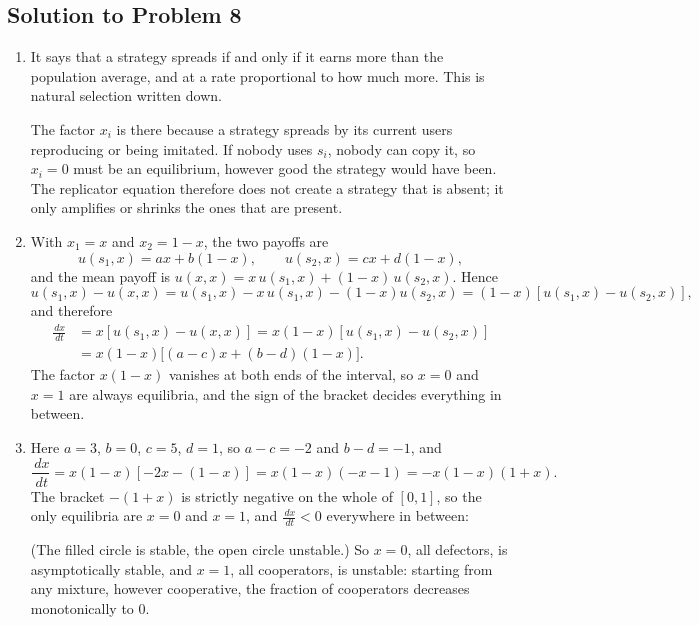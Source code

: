 \documentclass[a4paper,12pt]{article}
\newcommand{\dd}{\,d}
\begin{document}
\subsection*{Solution to Problem 8}

\begin{enumerate}[label=(\alph*)]
\item It says that a strategy spreads if and only if it earns more than the population average, and at a rate proportional to how much more. This is natural selection written down.

The factor $x_i$ is there because a strategy spreads by its current users reproducing or being imitated. If nobody uses $s_i$, nobody can copy it, so $x_i=0$ must be an equilibrium, however good the strategy would have been. The replicator equation therefore does not create a strategy that is absent; it only amplifies or shrinks the ones that are present.

\item With $x_1=x$ and $x_2=1-x$, the two payoffs are
\[ u(s_1,x) = ax+b(1-x),
\qquad
u(s_2,x) = cx+d(1-x) , \]
and the mean payoff is $u(x,x) = x\,u(s_1,x)+(1-x)\,u(s_2,x)$. Hence
\[ u(s_1,x)-u(x,x) = u(s_1,x) - x\,u(s_1,x) - (1-x)u(s_2,x) = (1-x)\left[ u(s_1,x)-u(s_2,x) \right] , \]
and therefore
\[ \begin{aligned}
\frac{\dd x}{\dd t} &= x\left[ u(s_1,x)-u(x,x) \right] = x(1-x)\left[ u(s_1,x)-u(s_2,x) \right]\\
&= x(1-x)\Big[ (a-c)x+(b-d)(1-x) \Big] .
\end{aligned} \]
The factor $x(1-x)$ vanishes at both ends of the interval, so $x=0$ and $x=1$ are always equilibria, and the sign of the bracket decides everything in between.

\item Here $a=3$, $b=0$, $c=5$, $d=1$, so $a-c=-2$ and $b-d=-1$, and
\[ \frac{\dd x}{\dd t} = x(1-x)\left[ -2x-(1-x) \right] = x(1-x)\left( -x-1 \right) = -x(1-x)(1+x) . \]
The bracket $-(1+x)$ is strictly negative on the whole of $[0,1]$, so the only equilibria are $x=0$ and $x=1$, and $\frac{\dd x}{\dd t}<0$ everywhere in between:
\begin{center}
\end{center}
(The filled circle is stable, the open circle unstable.) So $x=0$, all defectors, is asymptotically stable, and $x=1$, all cooperators, is unstable: starting from any mixture, however cooperative, the fraction of cooperators decreases monotonically to $0$.


\end{enumerate}
\end{document}
